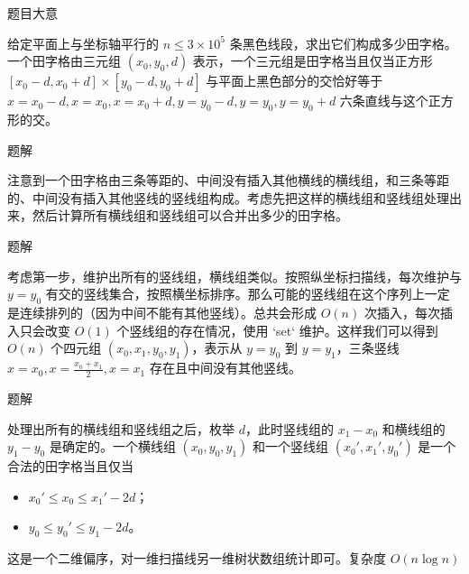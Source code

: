 \begin{frame}{题目大意}

给定平面上与坐标轴平行的 $n \le 3 \times 10^5$ 条黑色线段，求出它们构成多少田字格。一个田字格由三元组 $(x_0,y_0,d)$ 表示，一个三元组是田字格当且仅当正方形 $[x_0-d,x_0+d] \times [y_0-d,y_0+d]$ 与平面上黑色部分的交恰好等于 $x=x_0-d,x=x_0,x=x_0+d,y=y_0-d,y=y_0,y=y_0+d$ 六条直线与这个正方形的交。

\end{frame}

\begin{frame}{题解}

注意到一个田字格由三条等距的、中间没有插入其他横线的横线组，和三条等距的、中间没有插入其他竖线的竖线组构成。考虑先把这样的横线组和竖线组处理出来，然后计算所有横线组和竖线组可以合并出多少的田字格。

\end{frame}

\begin{frame}{题解}

考虑第一步，维护出所有的竖线组，横线组类似。按照纵坐标扫描线，每次维护与 $y = y_0$ 有交的竖线集合，按照横坐标排序。那么可能的竖线组在这个序列上一定是连续排列的（因为中间不能有其他竖线）。总共会形成 $O(n)$ 次插入，每次插入只会改变 $O(1)$ 个竖线组的存在情况，使用 `set` 维护。这样我们可以得到 $O(n)$ 个四元组 $(x_0,x_1,y_0,y_1)$，表示从 $y=y_0$ 到 $y = y_1$，三条竖线 $x=x_0,x=\frac{x_0+x_1}{2}, x=x_1$ 存在且中间没有其他竖线。

\end{frame}

\begin{frame}{题解}

处理出所有的横线组和竖线组之后，枚举 $d$，此时竖线组的 $x_1-x_0$ 和横线组的 $y_1-y_0$ 是确定的。一个横线组 $(x_0,y_0,y_1)$ 和一个竖线组 $(x_0',x_1',y_0')$ 是一个合法的田字格当且仅当 \pause


\begin{itemize}

\item $x_0' \le x_0 \le x_1' - 2d$； \pause
\item $y_0 \le y_0' \le y_1 - 2d$。 \pause

\end{itemize}

这是一个二维偏序，对一维扫描线另一维树状数组统计即可。复杂度 $O(n \log n)$

\end{frame}